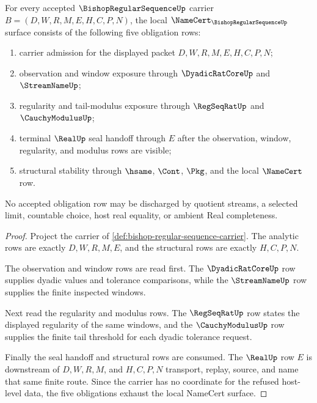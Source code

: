 \begin{theorem}
\label{thm:bishop-regular-sequence-namecert-obligations}
For every accepted $\BishopRegularSequenceUp$ carrier $B=(D,W,R,M,E,H,C,P,N)$, the local $\NameCert_{\BishopRegularSequenceUp}$ surface consists of the following five obligation rows:
\begin{enumerate}
\item carrier admission for the displayed packet $D,W,R,M,E,H,C,P,N$;
\item observation and window exposure through $\DyadicRatCoreUp$ and $\StreamNameUp$;
\item regularity and tail-modulus exposure through $\RegSeqRatUp$ and $\CauchyModulusUp$;
\item terminal $\RealUp$ seal handoff through $E$ after the observation, window, regularity, and modulus rows are visible;
\item structural stability through $\hsame$, $\Cont$, $\Pkg$, and the local $\NameCert$ row.
\end{enumerate}
No accepted obligation row may be discharged by quotient streams, a selected limit, countable choice, host real equality, or ambient Real completeness.
\end{theorem}
\begin{proof}
Project the carrier of \autoref{def:bishop-regular-sequence-carrier}. The analytic rows are exactly $D,W,R,M,E$, and the structural rows are exactly $H,C,P,N$.

The observation and window rows are read first. The $\DyadicRatCoreUp$ row supplies dyadic values and tolerance comparisons, while the $\StreamNameUp$ row supplies the finite inspected windows.

Next read the regularity and modulus rows. The $\RegSeqRatUp$ row states the displayed regularity of the same windows, and the $\CauchyModulusUp$ row supplies the finite tail threshold for each dyadic tolerance request.

Finally the seal handoff and structural rows are consumed. The $\RealUp$ row $E$ is downstream of $D,W,R,M$, and $H,C,P,N$ transport, replay, source, and name that same finite route. Since the carrier has no coordinate for the refused host-level data, the five obligations exhaust the local NameCert surface.
\end{proof}

